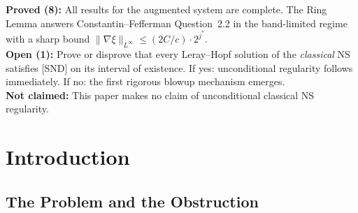 \documentclass[11pt]{article}
\begin{document}
\begin{mdframed}[
  linecolor=darkblue,
  linewidth=1.5pt,
  backgroundcolor=white,
  innertopmargin=10pt,
  innerbottommargin=10pt,
  innerleftmargin=12pt,
  innerrightmargin=12pt
]
\vspace{8pt}
{\small
\textbf{\color{proved}Proved (8):} All results for the augmented system are complete. The Ring Lemma answers
Constantin--Fefferman Question~2.2 in the band-limited regime with a sharp bound
$\|\nabla\xi\|_{L^\infty} \leq (2C/c)\cdot 2^{j^*}$.\\[4pt]
\textbf{\color{open}Open (1):} Prove or disprove that every Leray--Hopf solution of the
\emph{classical} NS satisfies [SND] on its interval of existence. If yes: unconditional
regularity follows immediately. If no: the first rigorous blowup mechanism emerges.\\[4pt]
\textbf{\color{notclaimed}Not claimed:} This paper makes no claim of unconditional classical
NS regularity.
}
\end{mdframed}

\vspace{10pt}

\begin{abstract}
We present a conditional regularity framework for the three-dimensional incompressible
Navier--Stokes equations on the periodic torus $\mathbb{T}^3$. The framework rests on three
contributions. First, a three-operator augmented system $(Q_1, Q_3, Q_6)$ designed to regulate
nonlinear energy transfer across Littlewood--Paley shells by intervening only where spectral
concentration develops. Second, the \emph{Ring Lemma}: on a single LP shell $S_{j^*}$, the
vorticity direction field $\xi = \omega/|\omega|$ satisfies
$\|\nabla\xi\|_{L^\infty} \leq C\cdot 2^{j^*}$, directly answering
Constantin--Fefferman Question~2.2 --- the rotation rate of the vorticity direction is controlled
by the shell frequency, not by the vorticity amplitude. Third, under a four-part Spectral
Non-Dispersal condition [SND], a Global Summation Lemma yields conditional global $H^1$
bounds. One precisely-stated open problem remains. No claim of unconditional regularity is made.
\end{abstract}

\section{Introduction}

\subsection{The Problem and the Obstruction}
\end{document}
